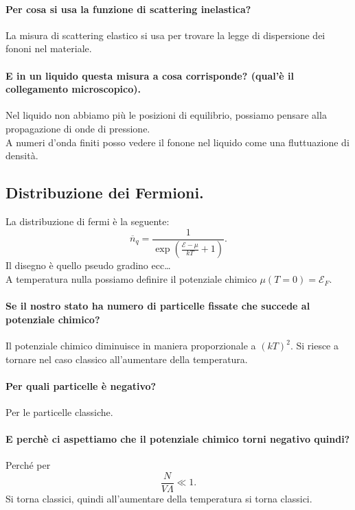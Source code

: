 \paragraph{Per cosa si usa la funzione di scattering inelastica?}%
La misura di scattering elastico si usa per trovare la legge di dispersione dei fononi nel materiale. 
\paragraph{E in un liquido questa misura a cosa corrisponde? (qual'è il collegamento microscopico).}%
Nel liquido non abbiamo più le posizioni di equilibrio, possiamo pensare alla propagazione di onde di pressione. \\
A numeri d'onda finiti posso vedere il fonone nel liquido come una fluttuazione di densità. 
\subsection{Distribuzione dei Fermioni.}%
\label{sub:Distribuzione dei Fermioni.}
La distribuzione di fermi è la seguente:
\[
    \overline{n}_q = \frac{1}{\exp\left(\frac{\mathcal{E}-\mu}{kT}+1\right)}
.\] 
Il disegno è quello pseudo gradino  ecc\ldots\\
A temperatura nulla possiamo definire il potenziale chimico $\mu (T=0) = \mathcal{E}_F$. 
\paragraph{Se il nostro stato ha numero di particelle fissate che succede al potenziale chimico?}%
\label{par:Se il nostro stato ha numero di particelle fissate che succede al potenziale chimico?}
Il potenziale chimico diminuisce in maniera proporzionale a $\left(kT\right)^2$. Si riesce a tornare nel caso classico all'aumentare della temperatura.
\paragraph{Per quali particelle è negativo?}%
\label{par:Per quali particelle è negativo?}
Per le particelle classiche.
\paragraph{E perchè ci aspettiamo che il potenziale chimico torni negativo quindi?}%
\label{par:E perchè ci aspettiamo che il potenziale chimico torni negativo quindi?}
Perché per 
\[
    \frac{N}{V\Lambda} \ll 1
.\] 
Si torna classici, quindi all'aumentare della temperatura si torna classici.
